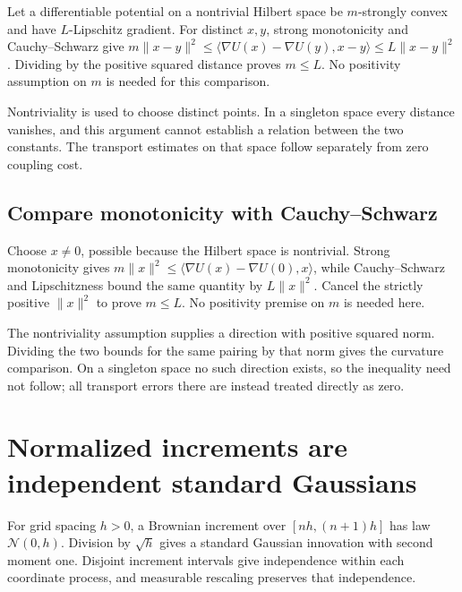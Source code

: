 \documentclass[11pt,a4paper]{report}
\begin{document}
Let a differentiable potential on a nontrivial Hilbert space be \(m\)-strongly convex and have \(L\)-Lipschitz gradient. For distinct \(x,y\), strong monotonicity and Cauchy–Schwarz give \(m\|x-y\|^2\le\langle\nabla U(x)-\nabla U(y),x-y\rangle\le L\|x-y\|^2\). Dividing by the positive squared distance proves \(m\le L\). No positivity assumption on \(m\) is needed for this comparison.



Nontriviality is used to choose distinct points. In a singleton space every distance vanishes, and this argument cannot establish a relation between the two constants. The transport estimates on that space follow separately from zero coupling cost.

\subsection{\texorpdfstring{Compare monotonicity with Cauchy–Schwarz}{Compare monotonicity with Cauchy–Schwarz}}
\label{report-step-UnadjustedLangevin-PotentialAssumptions-lean-1}


Choose \(x\ne0\), possible because the Hilbert space is nontrivial. Strong monotonicity gives \(m\|x\|^2\le\langle\nabla U(x)-\nabla U(0),x\rangle\), while Cauchy–Schwarz and Lipschitzness bound the same quantity by \(L\|x\|^2\). Cancel the strictly positive \(\|x\|^2\) to prove \(m\le L\). No positivity premise on \(m\) is needed here.



The nontriviality assumption supplies a direction with positive squared norm. Dividing the two bounds for the same pairing by that norm gives the curvature comparison. On a singleton space no such direction exists, so the inequality need not follow; all transport errors there are instead treated directly as zero.

\section{\texorpdfstring{Normalized increments are independent standard Gaussians}{Normalized increments are independent standard Gaussians}}
\label{proof-module-UnadjustedLangevin-BrownianInnovations-lean}


For grid spacing \(h>0\), a Brownian increment over \([nh,(n+1)h]\) has law \(\mathcal N(0,h)\). Division by \(\sqrt h\) gives a standard Gaussian innovation with second moment one. Disjoint increment intervals give independence within each coordinate process, and measurable rescaling preserves that independence.
\end{document}
